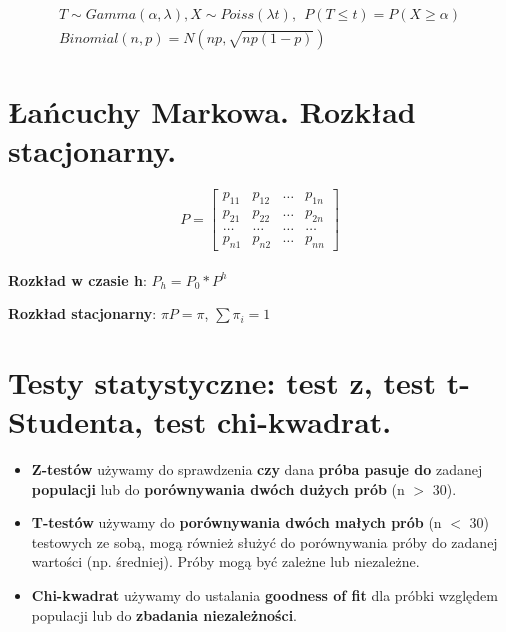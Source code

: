 \documentclass[main.tex]{subfiles}
\begin{document}
    \begin{gather*}
        T \sim Gamma(\alpha, \lambda), X \sim Poiss(\lambda t), ~~ P(T \leq t) = P( X \geq \alpha) \\
        Binomial(n, p) = N(np, \sqrt{np(1-p)})
    \end{gather*}


    \section{Łańcuchy Markowa. Rozkład stacjonarny.}

    \begin{equation*}
        P =
        \begin{bmatrix}
            p_{1 1} & p_{1 2} & \dots & p_{1 n}\\
            p_{2 1} & p_{2 2} & \dots & p_{2 n}\\
            \dots & \dots & \dots & \dots\\
            p_{n 1} & p_{n 2} & \dots & p_{n n}
        \end{bmatrix}
    \end{equation*}
    \hfill \\

    \textbf{Rozkład w czasie h}: $P_h = P_0 * P^h$

    \textbf{Rozkład stacjonarny}: $\pi P = \pi$, $\sum \pi_i = 1$


    \section{Testy statystyczne: test z, test t-Studenta, test chi-kwadrat.}

    \begin{itemize}
        \item \textbf{Z-testów} używamy do sprawdzenia \textbf{czy} dana \textbf{próba pasuje do} zadanej
        \textbf{populacji} lub do  \textbf{porównywania dwóch dużych prób} (n $>$ 30).
        \item \textbf{T-testów} używamy do \textbf{porównywania dwóch małych prób} (n $<$ 30) testowych ze sobą,
        mogą również służyć do porównywania próby do zadanej wartości (np. średniej).
        Próby mogą być zależne lub niezależne.
        \item \textbf{Chi-kwadrat} używamy do ustalania \textbf{goodness of fit} dla próbki względem populacji lub do
        \textbf{zbadania niezależności}.
    \end{itemize}
\end{document}
